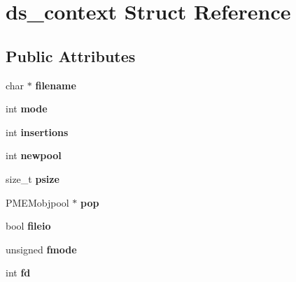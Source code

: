 \hypertarget{structds__context}{}\section{ds\+\_\+context Struct Reference}
\label{structds__context}
\subsection*{Public Attributes}
\begin{DoxyCompactItemize}
\item 
\mbox{\label{structds__context_a164c6d00c66a6fa48729b3c709aa4dd5}} 
char $\ast$ {\bfseries filename}
\item 
\mbox{\label{structds__context_a26b599f2639d5ba6fd571f7deb438039}} 
int {\bfseries mode}
\item 
\mbox{\label{structds__context_ab72d2cc9cbab07fede0e65c0c7b37d10}} 
int {\bfseries insertions}
\item 
\mbox{\label{structds__context_a527716230aa63398a8dade8029f0649c}} 
int {\bfseries newpool}
\item 
\mbox{\label{structds__context_a2d82a7eb4e13a9841bf55199fabd706f}} 
size\+\_\+t {\bfseries psize}
\item 
\mbox{\label{structds__context_ac2c635639cf5495e7b0ce4b82659146a}} 
P\+M\+E\+Mobjpool $\ast$ {\bfseries pop}
\item 
\mbox{\label{structds__context_a0ec463e2fa6e543aad41d0a6d12b9971}} 
bool {\bfseries fileio}
\item 
\mbox{\label{structds__context_a322561a4c870afa684a1c38159dfe8d4}} 
unsigned {\bfseries fmode}
\item 
\mbox{\label{structds__context_acd1582bade589b6f66d9b2e0b915da39}} 
int {\bfseries fd}
\item 
\mbox{\label{structds__context_a6d9cec34cd6854d2c53383a2218cd3cc}} 

\end{DoxyCompactItemize}
